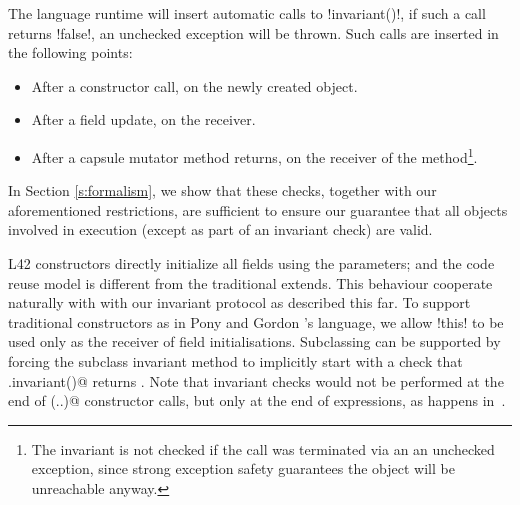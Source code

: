 



The language runtime will insert automatic calls to \Q!invariant()!, if such a call returns \Q!false!, an unchecked exception will be thrown. Such calls are inserted in the following points:
\begin{itemize}
	\item After a constructor call, on the newly created object.
	\item After a field update, on the receiver.
	\item After a capsule mutator method returns, on the receiver of the method\footnote{The invariant is not checked if the call was terminated via an an unchecked exception, since strong exception safety guarantees the object will be unreachable anyway.}.
\end{itemize}
\noindent In Section \ref{s:formalism}, we show that these checks, together with our aforementioned restrictions, are sufficient to ensure our guarantee that all objects involved in execution (except as part of an invariant check) are valid.

L42 constructors directly initialize all fields using the parameters; and the code reuse model is different from the traditional extends.
This behaviour cooperate naturally with with our invariant protocol as described this far.
To support traditional constructors as in Pony and Gordon \etal's language, we allow \Q!this! to be used only as the receiver of field initialisations. 
Subclassing can be supported by forcing the subclass invariant method to implicitly start with a check that \Q@super.invariant()@ returns \Q@true@. Note that invariant checks would not be performed at the end of \Q@super(..)@ constructor calls, but only at the end of \Q@new@ expressions, as happens in~\cite{feldman2006jose}.